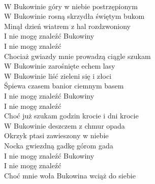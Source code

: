 
\tab{}\tab{}\tab{}\\
W Bukowinie góry w niebie postrzępionym \tab{} \\
W Bukowinie rosną skrzydła świętym bukom \tab{}\\
Minął dzień wiatrem z hal rozdzwoniony\tab{} \\
I nie mogę znaleźć Bukowiny \tab{}\tab{}\\
I nie mogę znaleźć \tab{}\tab{}\\
Chociaż gwiazdy mnie prowadzą ciągle szukam \\
\hops
W Bukowinie zarośnięte echem lasy \\
W Bukowinie liść zieleni się i złoci \\
Śpiewa czasem banior ciemnym basem \\
I nie mogę znaleźć Bukowiny \\
I nie mogę znaleźć \\
Choć już szukam godzin krocie i dni krocie \\
\hops
W Bukowinie deszczem z chmur opada \\
Okrzyk ptasi zawieszony w niebie \\
Nocka gwiezdną gadkę górom gada \\
I nie mogę znaleźć Bukowiny \\
I nie mogę znaleźć \\
Choć mnie woła Bukowina wciąż do siebie